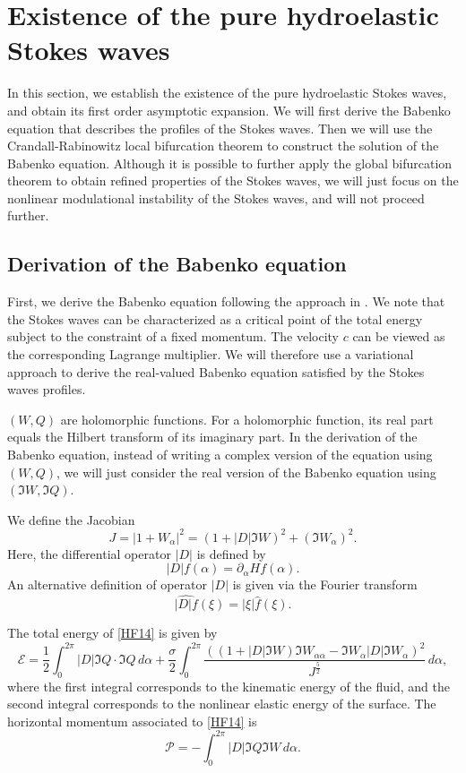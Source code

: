 \documentclass[12pt]{amsart}
\theoremstyle{remark}
\theoremstyle{definition}
\numberwithin{equation}{section}
\newcommand{\al}{\alpha}
\newcommand{\f}{\frac}
\begin{document}
\section{Existence of the pure hydroelastic Stokes waves}  \label{s:Stokes}   
In this section, we establish the existence of the pure hydroelastic Stokes waves, and obtain its first order asymptotic expansion.
We will first derive the Babenko equation that describes the profiles of the Stokes waves.
Then we will use the Crandall-Rabinowitz local bifurcation theorem to construct the solution of the Babenko equation. 
Although it is possible to further apply the global bifurcation theorem to obtain refined properties of the Stokes waves, we will just focus on the nonlinear modulational instability of the Stokes waves, and will not proceed further.

\subsection{Derivation of the Babenko equation}    
First, we derive the Babenko equation following the approach in \cite{Rowan24}.
We note that  the Stokes waves can be characterized as a critical point of the total energy subject to the constraint of a fixed momentum.
The velocity $c$ can be viewed as the corresponding Lagrange multiplier.
We will therefore use a variational approach to derive the real-valued Babenko equation satisfied by the Stokes waves profiles.

$(W, Q)$ are holomorphic functions.
For a holomorphic function, its real part equals the Hilbert transform of its imaginary part.
In the derivation of the Babenko equation, instead of writing a complex version of the equation using $(W,Q)$, we will just consider the real version of the Babenko equation using $(\Im W, \Im Q)$.

We define the Jacobian
\begin{equation*}
    J = |1+W_\alpha|^2 = (1+|D|\Im W)^2 +(\Im W_\alpha)^2.
\end{equation*}
Here, the differential operator $|D|$ is defined by
\begin{equation*}
    |D|f(\alpha) = \partial_\alpha Hf(\alpha).
\end{equation*}
An alternative definition of operator $|D|$ is given via the Fourier transform
\begin{equation*}
    \widehat{|D|f}(\xi) = |\xi|\hat{f}(\xi).
\end{equation*}

The total energy of \eqref{HF14} is given by
\begin{equation*}
    \mathcal{E} = \frac{1}{2}\int_0^{2\pi} |D|\Im Q \cdot\Im Q \,d\alpha +  \frac{\sigma}{2}\int_0^{2\pi}   \frac{((1+|D|\Im W) \Im W_{\al \al} - \Im W_\al |D|\Im W_\al)^2}{J^\f52} \,d\al,
\end{equation*}
where the first integral corresponds to the kinematic energy of the fluid, and the second integral corresponds to the nonlinear elastic energy of the surface.
The horizontal momentum associated to \eqref{HF14} is
\begin{equation*}
    \mathcal{P} = -\int_0^{2\pi} |D|\Im Q \Im W \, d\alpha. 
\end{equation*}
\end{document}
